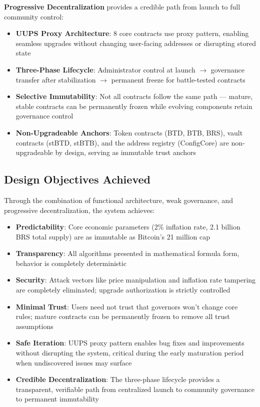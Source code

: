 \documentclass{article}
\begin{document}
\textbf{Progressive Decentralization} provides a credible path from launch to full community control:
\begin{itemize}
  \item \textbf{UUPS Proxy Architecture}: 8 core contracts use proxy pattern, enabling seamless upgrades without changing user-facing addresses or disrupting stored state
  \item \textbf{Three-Phase Lifecycle}: Administrator control at launch $\rightarrow$ governance transfer after stabilization $\rightarrow$ permanent freeze for battle-tested contracts
  \item \textbf{Selective Immutability}: Not all contracts follow the same path --- mature, stable contracts can be permanently frozen while evolving components retain governance control
  \item \textbf{Non-Upgradeable Anchors}: Token contracts (BTD, BTB, BRS), vault contracts (stBTD, stBTB), and the address registry (ConfigCore) are non-upgradeable by design, serving as immutable trust anchors
\end{itemize}

\subsection{Design Objectives Achieved}

Through the combination of functional architecture, weak governance, and progressive decentralization, the system achieves:
\begin{itemize}
  \item \textbf{Predictability}: Core economic parameters (2\% inflation rate, 2.1 billion BRS total supply) are as immutable as Bitcoin's 21 million cap
  \item \textbf{Transparency}: All algorithms presented in mathematical formula form, behavior is completely deterministic
  \item \textbf{Security}: Attack vectors like price manipulation and inflation rate tampering are completely eliminated; upgrade authorization is strictly controlled
  \item \textbf{Minimal Trust}: Users need not trust that governors won't change core rules; mature contracts can be permanently frozen to remove all trust assumptions
  \item \textbf{Safe Iteration}: UUPS proxy pattern enables bug fixes and improvements without disrupting the system, critical during the early maturation period when undiscovered issues may surface
  \item \textbf{Credible Decentralization}: The three-phase lifecycle provides a transparent, verifiable path from centralized launch to community governance to permanent immutability
\end{itemize}
\end{document}
